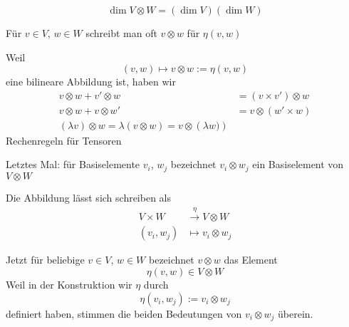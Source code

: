 \begin{Bem}
  \[\dim V\otimes W=\left( \dim V \right)\left( \dim W \right)\]
\end{Bem}
\begin{Not}
  Für $v\in V$, $w\in W$ schreibt man oft $v\otimes w$ für $\eta\left( v,w \right)$
\end{Not}
\begin{Bem}
  Weil
  \[\left( v,w \right)\mapsto v\otimes w:=\eta\left( v,w \right)\]
  eine bilineare Abbildung ist, haben wir
  \begin{align*}
    v\otimes w+v'\otimes w&=\left( v\times v'\right)\otimes w\\
    v\otimes w+v\otimes w'&=v\otimes \left(w'\times w\right)\\
    \left( \lambda v \right)\otimes w=\lambda\left( v\otimes w \right)=v\otimes\left( \lambda w) \right)
  \end{align*}
  Rechenregeln für Tensoren
\end{Bem}
\begin{Not}
  Letztes Mal: für Basiselemente $v_i$, $w_j$ bezeichnet $v_i\otimes w_j$ ein Basiselement von $V\otimes W$
\end{Not}
\begin{Bem}
  Die Abbildung lässt sich schreiben als
  \begin{align*}
    V\times W&\xrightarrow{\eta}V\otimes W\\
    \left( v_i,w_j \right)&\mapsto v_i\otimes w_j
  \end{align*}
\end{Bem}
\begin{Bem}
  Jetzt für beliebige $v\in V$, $w\in W$ bezeichnet $v\otimes w$ das Element
  \[\eta\left( v,w \right)\in V\otimes W\]
  Weil in der Konstruktion wir $\eta$ durch
  \[\eta\left( v_i,w_j \right):=v_i\otimes w_j\]
  definiert haben, stimmen die beiden Bedeutungen von $v_i\otimes w_j$ überein.
\end{Bem}
